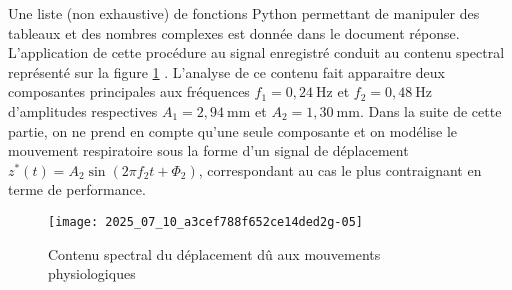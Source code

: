 Une liste (non exhaustive) de fonctions Python permettant de manipuler des tableaux et des nombres complexes est donnée dans le document réponse.\\
L'application de cette procédure au signal enregistré conduit au contenu spectral représenté sur la figure \ref{ccs_psi_2019_fig_05} . L'analyse de ce contenu fait apparaitre deux composantes principales aux fréquences $f_{1}=0,24 \mathrm{~Hz}$ et $f_{2}=0,48 \mathrm{~Hz}$ d'amplitudes respectives $A_{1}=2,94 \mathrm{~mm}$ et $A_{2}=1,30 \mathrm{~mm}$. Dans la suite de cette partie, on ne prend en compte qu'une seule composante et on modélise le mouvement respiratoire sous la forme d'un signal de déplacement $z^{*}(t)=A_{2} \sin \left(2 \pi f_{2} t+\Phi_{2}\right)$, correspondant au cas le plus contraignant en terme de performance.


\begin{figure}[!h]
\centering
\texttt{[image: 2025\_07\_10\_a3cef788f652ce14ded2g-05]}

\caption{Contenu spectral du déplacement dû aux mouvements physiologiques\label{ccs_psi_2019_fig_05}}
\end{figure}




